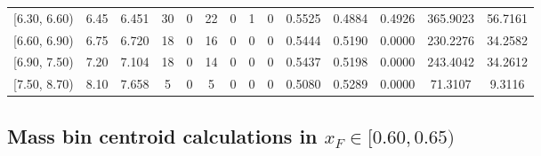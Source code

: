 \begin{table}[htbp]
{\begin{tabular}{cc|c|cccccc|ccc|cc}
        {[6.30, 6.60)} & 6.45 & 6.451 & 30 & 0 & 22 & 0 & 1 & 0 & 0.5525 & 0.4884 & 0.4926 & 365.9023 & 56.7161 \\
        {[6.60, 6.90)} & 6.75 & 6.720 & 18 & 0 & 16 & 0 & 0 & 0 & 0.5444 & 0.5190 & 0.0000 & 230.2276 & 34.2582 \\
        {[6.90, 7.50)} & 7.20 & 7.104 & 18 & 0 & 14 & 0 & 0 & 0 & 0.5437 & 0.5198 & 0.0000 & 243.4042 & 34.2612 \\
        {[7.50, 8.70)} & 8.10 & 7.658 & 5 & 0 & 5 & 0 & 0 & 0 & 0.5080 & 0.5289 & 0.0000 & 71.3107 & 9.3116 \\
        \hline\hline
    \end{tabular}
    }
\end{table}

\clearpage
\subsection{\texorpdfstring{Mass bin centroid calculations in $x_F \in [0.60, 0.65)$}{Mass bin centroid calculations in x\_F in [0.60, 0.65)]}}

